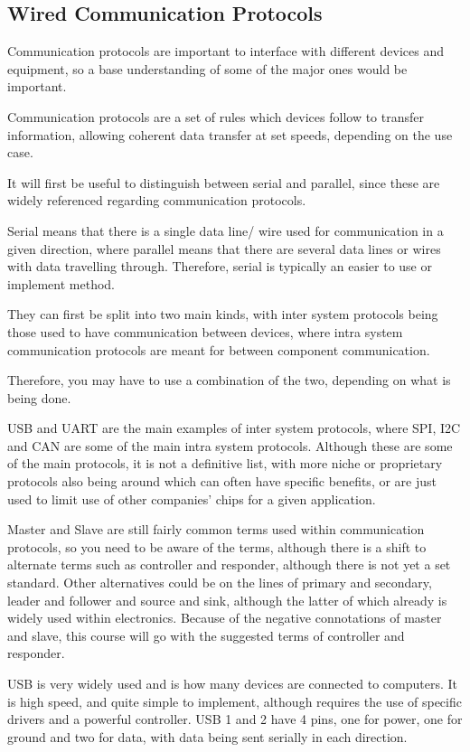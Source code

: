 \documentclass[a4paper,11pt]{report}
\begin{document}
\subsection{Wired Communication Protocols}

Communication protocols are important to interface with different devices and equipment, so a base understanding of some of the major ones would be important.

Communication protocols are a set of rules which devices follow to transfer information, allowing coherent data transfer at set speeds, depending on the use case.

It will first be useful to distinguish between serial and parallel, since these are widely referenced regarding communication protocols.

Serial means that there is a single data line/ wire used for communication in a given direction, where parallel means that there are several data lines or wires with data travelling through. Therefore, serial is typically an easier to use or implement method.

They can first be split into two main kinds, with inter system protocols being those used to have communication between devices, where intra system communication protocols are meant for between component communication.

Therefore, you may have to use a combination of the two, depending on what is being done.

USB and UART are the main examples of inter system protocols, where SPI, I2C and CAN are some of the main intra system protocols. Although these are some of the main protocols, it is not a definitive list, with more niche or proprietary protocols also being around which can often have specific benefits, or are just used to limit use of other companies' chips for a given application.

Master and Slave are still fairly common terms used within communication protocols, so you need to be aware of the terms, although there is a shift to alternate terms such as controller and responder, although there is not yet a set standard. Other alternatives could be on the lines of primary and secondary, leader and follower and source and sink, although the latter of which already is widely used within electronics. Because of the negative connotations of master and slave, this course will go with the suggested terms of controller and responder.

USB is very widely used and is how many devices are connected to computers. It is high speed, and quite simple to implement, although requires the use of specific drivers and a powerful controller. USB 1 and 2 have 4 pins, one for power, one for ground and two for data, with data being sent serially in each direction.
\end{document}
